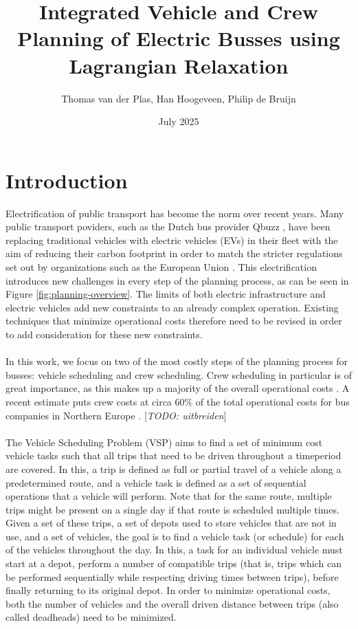 \documentclass[]{article}
\title{Integrated Vehicle and Crew Planning of Electric Busses using Lagrangian Relaxation}
\date{July 2025}
\author{Thomas van der Plas, Han Hoogeveen, Philip de Bruijn}
\newcommand{\todo}[1]{{\color{red}[\textit{TODO: #1}]}}
\begin{document}
\maketitle

\section{Introduction}
Electrification  of public transport has become the norm over recent years. Many public transport poviders, such as the Dutch bus provider Qbuzz \cite{qbuzzQbuzz}, have been replacing traditional vehicles with electric vehicles (EVs) in their fleet with the aim of reducing their carbon footprint in order to match the stricter regulations set out by organizations such as the European Union \cite{europaRegulation20181999}. This electrification introduces new challenges in every step of the planning process, as can be seen in Figure \ref{fig:planning-overview}. The limits of both electric infrastructure and electric vehicles add new constraints to an already complex operation. Existing techniques that minimize operational costs therefore need to be revised in order to add consideration for these new constraints. \\\\
In this work, we focus on two of the most costly steps of the planning process for busses: vehicle scheduling and crew scheduling. Crew scheduling in particular is of great importance, as this makes up a majority of the overall operational costs \cite{BODIN198363}. A recent estimate puts crew costs at circa $60\%$ of the total operational costs for bus companies in Northern Europe \cite{PERUMAL2019280}. \todo{uitbreiden} \\\\
The Vehicle Scheduling Problem (VSP) aims to find a set of minimum cost vehicle tasks such that all trips that need to be driven throughout a timeperiod are covered. In this, a trip is defined as full or partial travel of a vehicle along a predetermined route, and a vehicle task is defined as a set of sequential operations that a vehicle will perform. Note that for the same route, multiple trips might be present on a single day if that route is scheduled multiple times. \\
Given a set of these trips, a set of depots used to store vehicles that are not in use, and a set of vehicles, the goal is to find a vehicle task (or schedule) for each of the vehicles throughout the day. In this, a task for an individual vehicle must start at a depot, perform a number of compatible trips (that is, trips which can be performed sequentially while respecting driving times between trips), before finally returning to its original depot. In order to minimize operational costs, both the number of vehicles and the overall driven distance between trips (also called deadheads) need to be minimized. \\
\end{document}
